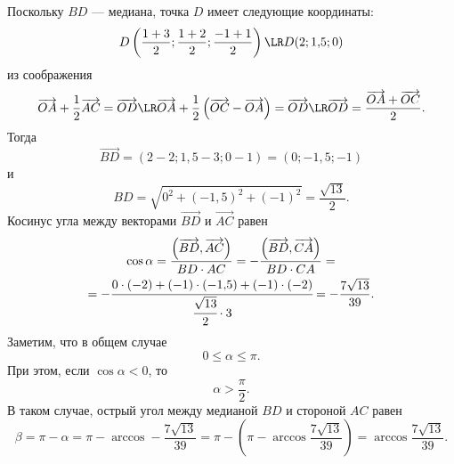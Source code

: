 Поскольку $BD$ --- медиана, точка $D$ имеет следующие координаты:
\[
D\left(\frac{1+3}{2};\frac{1+2}{2};\frac{-1+1}{2}\right)\LR D(2;1{,}5;0)
\]
из соображения 
\[
\overrightarrow{OA}+\frac{1}{2}\overrightarrow{AC}=\overrightarrow{OD}\LR\overrightarrow{OA}+\frac{1}{2}\left(\overrightarrow{OC}-\overrightarrow{OA}\right)=\overrightarrow{OD}\LR\overrightarrow{OD}=\frac{\overrightarrow{OA}+\overrightarrow{OC}}{2}.
\]
Тогда
\[
\overrightarrow{BD}=(2-2;1{,}5-3;0-1)=(0;-1{,}5;-1)
\]
и
\[
BD=\sqrt{0^2+(-1{,}5)^2+(-1)^2}=\frac{\sqrt{13}}{2}.
\]
Косинус угла между векторами $\overrightarrow{BD}$ и $\overrightarrow{AC}$ равен
\begin{multline*}
\cos\alpha=\frac{\left(\overrightarrow{BD},\overrightarrow{AC}\right)}{BD\cdot AC}=-\frac{\left(\overrightarrow{BD},\overrightarrow{CA}\right)}{BD\cdot CA}= \\
=-\cfrac{0\cdot(-2)+(-1)\cdot(-1{,}5)+(-1)\cdot(-2)}{\cfrac{\sqrt{13}}{2}\cdot3}=-\frac{7\sqrt{13}}{39}.
\end{multline*}
Заметим, что в общем случае
\[
0\leq\alpha\leq\pi.
\]
При этом, если $\cos\alpha<0$, то
\[
\alpha>\frac{\pi}{2}.
\]
В таком случае, острый угол между медианой $BD$ и стороной $AC$ равен
\[
\beta=\pi-\alpha=\pi-\arccos-\frac{7\sqrt{13}}{39}=\pi-\left(\pi-\arccos\frac{7\sqrt{13}}{39}\right)=\arccos\frac{7\sqrt{13}}{39}.
\]